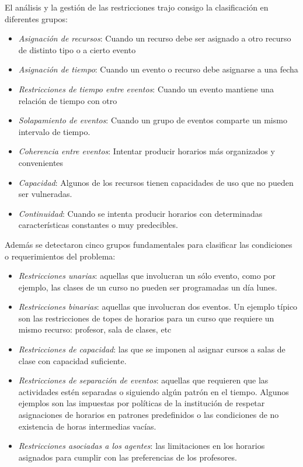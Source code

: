 El análisis y la gestión de las restricciones trajo consigo la clasificación en diferentes grupos:
\begin{itemize}
	\item \textit{Asignación de recursos}: Cuando un recurso debe ser asignado a otro recurso de distinto tipo o a cierto evento
	\item \textit{Asignación de tiempo}: Cuando un evento o recurso debe asignarse a una fecha
	\item \textit{Restricciones de tiempo entre eventos}: Cuando un evento mantiene una relación de tiempo con otro
	\item \textit{Solapamiento de eventos}: Cuando un grupo de eventos comparte un mismo intervalo de tiempo.
	\item \textit{Coherencia entre eventos}: Intentar producir horarios más organizados y convenientes
	\item \textit{Capacidad}: Algunos de los recursos tienen capacidades de uso que no pueden ser vulneradas.
	\item \textit{Continuidad}: Cuando se intenta producir horarios con determinadas características constantes o muy predecibles.
	
\end{itemize}

Además se detectaron cinco grupos fundamentales para clasificar las condiciones o requerimientos del problema:
\begin{itemize}
	\item \textit{Restricciones unarias}: aquellas que involucran un sólo evento, como por ejemplo, las clases de un curso no pueden ser programadas un día lunes.
	\item \textit{Restricciones binarias}: aquellas que involucran dos eventos. Un ejemplo típico son las restricciones de topes de horarios para un curso que requiere un mismo recurso: profesor, sala de clases, etc
	\item \textit{Restricciones de capacidad}: las que se imponen al asignar cursos a salas de clase con capacidad suficiente.
	\item \textit{Restricciones de separación de eventos}:  aquellas que requieren que las actividades estén separadas o siguiendo algún patrón en el tiempo. Algunos ejemplos son las impuestas por políticas de la institución de respetar asignaciones de horarios en patrones predefinidos o las condiciones de no existencia de horas intermedias vacías.
	\item \textit{Restricciones asociadas a los  agentes}: las limitaciones en los horarios asignados para cumplir con las preferencias de los profesores.
\end{itemize}

